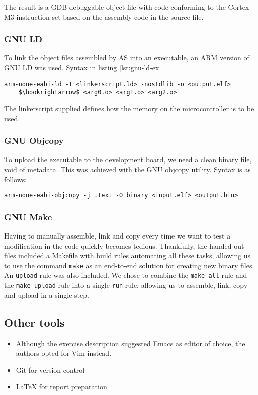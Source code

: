 The result is a GDB-debuggable object file with code conforming to the Cortex-M3 instruction set based on the assembly code in the source file.

\subsubsection{GNU LD}

To link the object files assembled by AS into an executable, an ARM version of GNU LD was used. Syntax in listing \ref{lst:gnu-ld-ex}

\begin{lstlisting}[label=lst:gnu-ld-ex,caption=Linker usage, mathescape]
arm-none-eabi-ld -T <linkerscript.ld> -nostdlib -o <output.elf>
    $\hookrightarrow$ <arg0.o> <arg1.o> <arg2.o>
\end{lstlisting}

The linkerscript supplied defines how the memory on the microcontroller is to be used.

\subsubsection{GNU Objcopy}

To upload the executable to the development board, we need a clean binary file, void of metadata. This was achieved with the GNU objcopy utility. Syntax is as follows:

\begin{lstlisting}[label=lst:gnu-objcopy-ex,caption=Objcopy usage]
arm-none-eabi-objcopy -j .text -O binary <input.elf> <output.bin>
\end{lstlisting}


\subsubsection{GNU Make}

Having to manually assemble, link and copy every time we want to test a modification in the code quickly becomes tedious. Thankfully, the handed out files included a Makefile with build rules automating all these tasks, allowing us to use the command \texttt{make} as an end-to-end solution for creating new binary files. An \texttt{upload} rule was also included. We chose to combine the \texttt{make all} rule and the \texttt{make upload} rule into a single \texttt{run} rule, allowing us to assemble, link, copy and upload in a single step.

\subsection{Other tools}

\begin{itemize}
\item Although the exercise description suggested Emacs as editor of choice, the authors opted for Vim instead.
\item Git for version control
\item \LaTeX{} for report preparation
\end{itemize}

